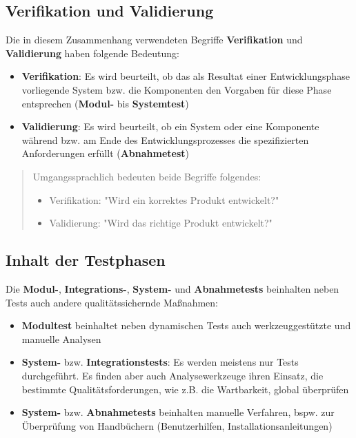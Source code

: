\subsection*{Verifikation und Validierung}
Die in diesem Zusammenhang verwendeten Begriffe \textbf{Verifikation} und \textbf{Validierung} haben folgende Bedeutung:

\begin{itemize}
    \item \textbf{Verifikation}: Es wird beurteilt, ob das als Resultat einer Entwicklungsphase vorliegende System bzw. die Komponenten den Vorgaben für diese Phase entsprechen (\textbf{Modul-} bis \textbf{Systemtest})
    \item \textbf{Validierung}: Es wird beurteilt, ob ein System oder eine Komponente während bzw. am Ende des Entwicklungsprozesses die spezifizierten Anforderungen erfüllt (\textbf{Abnahmetest})
\end{itemize}

\begin{tcolorbox}[colback=white]
    \blockquote[{\cite[554]{Bal08}}]{
    Umgangssprachlich bedeuten beide Begriffe folgendes:
    \begin{itemize}
        \item Verifikation: "Wird ein korrektes Produkt entwickelt?"
        \item Validierung: "Wird das richtige Produkt entwickelt?"
    \end{itemize}
    }
\end{tcolorbox}

\subsection*{Inhalt der Testphasen}
Die \textbf{Modul-}, \textbf{Integrations-}, \textbf{System-} und \textbf{Abnahmetests} beinhalten neben Tests auch andere qualitätssichernde Maßnahmen:

\begin{itemize}
    \item \textbf{Modultest} beinhaltet neben dynamischen Tests auch werkzeuggestützte und manuelle Analysen
    \item \textbf{System-} bzw. \textbf{Integrationstests}: Es werden meistens nur Tests durchgeführt. Es finden aber auch Analysewerkzeuge ihren Einsatz, die bestimmte Qualitätsforderungen, wie z.B. die Wartbarkeit, global überprüfen
    \item \textbf{System-} bzw. \textbf{Abnahmetests} beinhalten manuelle Verfahren, bspw. zur Überprüfung von Handbüchern (Benutzerhilfen, Installationsanleitungen)
\end{itemize}

